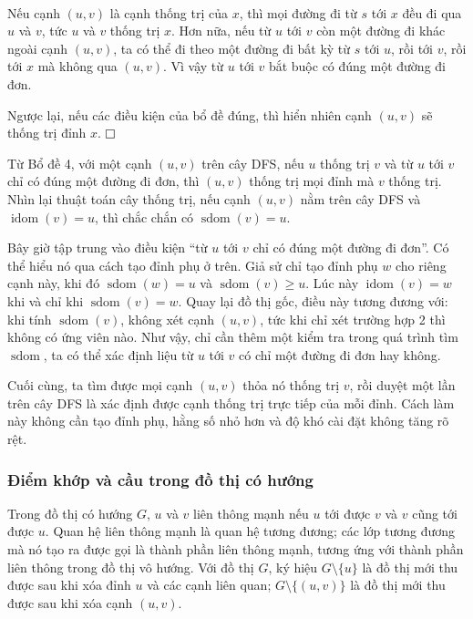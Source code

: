 \documentclass[11pt]{article}
\newcommand{\proofbox}{\ensuremath{\vcenter{\hrule height 0.45pt
  \hbox{\vrule width 0.45pt height 6pt\kern 6pt\vrule width 0.45pt}
  \hrule height 0.45pt}}}
\begin{document}
\paragraph{}
Nếu cạnh \((u,v)\) là cạnh thống trị của \(x\), thì mọi đường đi từ \(s\) tới
\(x\) đều đi qua \(u\) và \(v\), tức \(u\) và \(v\) thống trị \(x\). Hơn nữa,
nếu từ \(u\) tới \(v\) còn một đường đi khác ngoài cạnh \((u,v)\), ta có thể đi
theo một đường đi bất kỳ từ \(s\) tới \(u\), rồi tới \(v\), rồi tới \(x\) mà
không qua \((u,v)\). Vì vậy từ \(u\) tới \(v\) bắt buộc có đúng một đường đi
đơn.

Ngược lại, nếu các điều kiện của bổ đề đúng, thì hiển nhiên cạnh \((u,v)\) sẽ
thống trị đỉnh \(x\). \proofbox

Từ Bổ đề 4, với một cạnh \((u,v)\) trên cây DFS, nếu \(u\) thống trị \(v\) và
từ \(u\) tới \(v\) chỉ có đúng một đường đi đơn, thì \((u,v)\) thống trị mọi
đỉnh mà \(v\) thống trị. Nhìn lại thuật toán cây thống trị, nếu cạnh \((u,v)\)
nằm trên cây DFS và \(\operatorname{idom}(v)=u\), thì chắc chắn có
\(\operatorname{sdom}(v)=u\).

Bây giờ tập trung vào điều kiện ``từ \(u\) tới \(v\) chỉ có đúng một đường đi
đơn''. Có thể hiểu nó qua cách tạo đỉnh phụ ở trên. Giả sử chỉ tạo đỉnh phụ
\(w\) cho riêng cạnh này, khi đó \(\operatorname{sdom}(w)=u\) và
\(\operatorname{sdom}(v)\ge u\). Lúc này \(\operatorname{idom}(v)=w\) khi và
chỉ khi \(\operatorname{sdom}(v)=w\). Quay lại đồ thị gốc, điều này tương
đương với: khi tính \(\operatorname{sdom}(v)\), không xét cạnh \((u,v)\), tức
khi chỉ xét trường hợp 2 thì không có ứng viên nào. Như vậy, chỉ cần thêm một
kiểm tra trong quá trình tìm \(\operatorname{sdom}\), ta có thể xác định liệu
từ \(u\) tới \(v\) có chỉ một đường đi đơn hay không.

Cuối cùng, ta tìm được mọi cạnh \((u,v)\) thỏa nó thống trị \(v\), rồi duyệt
một lần trên cây DFS là xác định được cạnh thống trị trực tiếp của mỗi đỉnh.
Cách làm này không cần tạo đỉnh phụ, hằng số nhỏ hơn và độ khó cài đặt không
tăng rõ rệt.

\subsubsection{Điểm khớp và cầu trong đồ thị có hướng}

Trong đồ thị có hướng \(G\), \(u\) và \(v\) liên thông mạnh nếu \(u\) tới được
\(v\) và \(v\) cũng tới được \(u\). Quan hệ liên thông mạnh là quan hệ tương
đương; các lớp tương đương mà nó tạo ra được gọi là thành phần liên thông mạnh,
tương ứng với thành phần liên thông trong đồ thị vô hướng. Với đồ thị \(G\),
ký hiệu \(G\setminus\{u\}\) là đồ thị mới thu được sau khi xóa đỉnh \(u\) và
các cạnh liên quan; \(G\setminus\{(u,v)\}\) là đồ thị mới thu được sau khi xóa
cạnh \((u,v)\).
\end{document}
